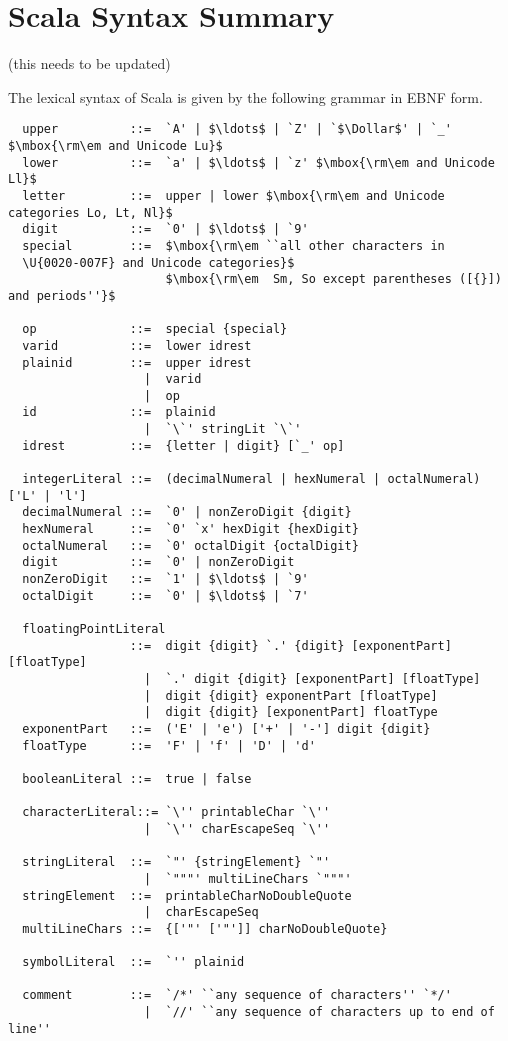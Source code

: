 \appendix
\chapter{Scala Syntax Summary}

(this needs to be updated)

The lexical syntax of Scala is given by the following grammar in EBNF
form.

\begin{lstlisting}
  upper          ::=  `A' | $\ldots$ | `Z' | `$\Dollar$' | `_' $\mbox{\rm\em and Unicode Lu}$
  lower          ::=  `a' | $\ldots$ | `z' $\mbox{\rm\em and Unicode Ll}$
  letter         ::=  upper | lower $\mbox{\rm\em and Unicode categories Lo, Lt, Nl}$
  digit          ::=  `0' | $\ldots$ | `9'
  special        ::=  $\mbox{\rm\em ``all other characters in
  \U{0020-007F} and Unicode categories}$
                      $\mbox{\rm\em  Sm, So except parentheses ([{}]) and periods''}$

  op             ::=  special {special} 
  varid          ::=  lower idrest
  plainid        ::=  upper idrest
                   |  varid
                   |  op
  id             ::=  plainid
                   |  `\`' stringLit `\`'
  idrest         ::=  {letter | digit} [`_' op]

  integerLiteral ::=  (decimalNumeral | hexNumeral | octalNumeral) ['L' | 'l']
  decimalNumeral ::=  `0' | nonZeroDigit {digit}
  hexNumeral     ::=  `0' `x' hexDigit {hexDigit}
  octalNumeral   ::=  `0' octalDigit {octalDigit}
  digit          ::=  `0' | nonZeroDigit
  nonZeroDigit   ::=  `1' | $\ldots$ | `9'
  octalDigit     ::=  `0' | $\ldots$ | `7'

  floatingPointLiteral 
                 ::=  digit {digit} `.' {digit} [exponentPart] [floatType]
                   |  `.' digit {digit} [exponentPart] [floatType]
                   |  digit {digit} exponentPart [floatType]
                   |  digit {digit} [exponentPart] floatType
  exponentPart   ::=  ('E' | 'e') ['+' | '-'] digit {digit}
  floatType      ::=  'F' | 'f' | 'D' | 'd'

  booleanLiteral ::=  true | false

  characterLiteral::= `\'' printableChar `\''
                   |  `\'' charEscapeSeq `\''

  stringLiteral  ::=  `"' {stringElement} `"'
                   |  `"""' multiLineChars `"""'
  stringElement  ::=  printableCharNoDoubleQuote 
                   |  charEscapeSeq
  multiLineChars ::=  {['"' ['"']] charNoDoubleQuote}

  symbolLiteral  ::=  `'' plainid

  comment        ::=  `/*' ``any sequence of characters'' `*/'
                   |  `//' ``any sequence of characters up to end of line''
\end{lstlisting}

